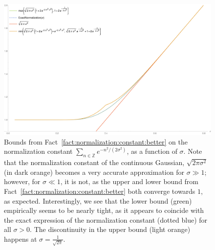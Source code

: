 \documentclass{jpc}
\newcommand{\Z}{\mathbb{Z}}
\begin{document}
\begin{figure}[ht]
    \centering
    \includegraphics[width=1.00\textwidth]{normalizationconstant}
    \caption{Bounds from Fact~\ref{fact:normalization:constant:better} on the normalization constant $\sum_{n\in\Z} e^{-n^2/(2\sigma^2)}$, as a function of $\sigma$. Note that the normalization constant of the continuous Gaussian, $\sqrt{2\pi\sigma^2}$ (in dark orange) becomes a very accurate approximation for $\sigma \gg 1$; however, for $\sigma \ll 1$, it is not, as the upper and lower bound from Fact~\ref{fact:normalization:constant:better} both converge towards $1$, as expected. Interestingly, we see that the lower bound (green) empirically seems to be nearly tight, as it appears to coincide with the exact expression of the normalization constant (dotted blue) for all $\sigma >0$. The discontinuity in the upper bound (light orange) happens at $\sigma=\frac{1}{\sqrt{2\pi}}$.}
    \label{fig:normalization:constant}
\end{figure}
\end{document}
